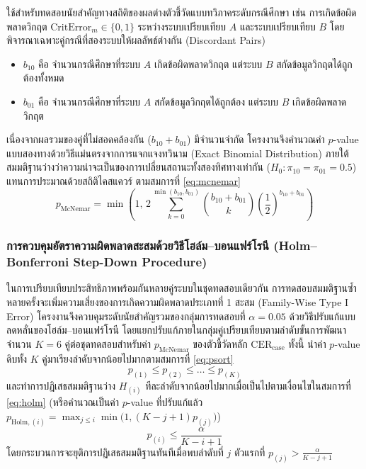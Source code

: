 ใช้สำหรับทดสอบนัยสำคัญทางสถิติของผลต่างตัวชี้วัดแบบทวิภาคระดับกรณีศึกษา เช่น การเกิดข้อผิดพลาดวิกฤต $\mathrm{CritError}_m \in \{0, 1\}$ ระหว่างระบบเปรียบเทียบ $A$ และระบบเปรียบเทียบ $B$ โดยพิจารณาเฉพาะคู่กรณีที่สองระบบให้ผลลัพธ์ต่างกัน (Discordant Pairs)
\begin{itemize}
    \item $b_{10}$ คือ จำนวนกรณีศึกษาที่ระบบ $A$ เกิดข้อผิดพลาดวิกฤต แต่ระบบ $B$ สกัดข้อมูลวิกฤตได้ถูกต้องทั้งหมด
    \item $b_{01}$ คือ จำนวนกรณีศึกษาที่ระบบ $A$ สกัดข้อมูลวิกฤตได้ถูกต้อง แต่ระบบ $B$ เกิดข้อผิดพลาดวิกฤต
\end{itemize}
เนื่องจากผลรวมของคู่ที่ไม่สอดคล้องกัน ($b_{10} + b_{01}$) มีจำนวนจำกัด โครงงานจึงคำนวณค่า $p$-value แบบสองทางด้วยวิธีแม่นตรงจากการแจกแจงทวินาม (Exact Binomial Distribution) ภายใต้สมมติฐานว่างว่าความน่าจะเป็นของการเปลี่ยนสถานะทั้งสองทิศทางเท่ากัน ($H_0: \pi_{10} = \pi_{01} = 0.5$) แทนการประมาณด้วยสถิติไคสแควร์ \cite{mcnemar1947note} ตามสมการที่ \eqref{eq:mcnemar}
\begin{equation}
p_{\mathrm{McNemar}} = \min\left(1,\, 2 \sum_{k=0}^{\min(b_{10}, b_{01})} \binom{b_{10} + b_{01}}{k} \left(\frac{1}{2}\right)^{b_{10} + b_{01}}\right)
\label{eq:mcnemar}
\end{equation}

\subsubsection{การควบคุมอัตราความผิดพลาดสะสมด้วยวิธีโฮล์ม--บอนแฟร์โรนี (Holm--Bonferroni Step-Down Procedure)}

ในการเปรียบเทียบประสิทธิภาพพร้อมกันหลายคู่ระบบในชุดทดสอบเดียวกัน การทดสอบสมมติฐานซ้ำหลายครั้งจะเพิ่มความเสี่ยงของการเกิดความผิดพลาดประเภทที่ 1 สะสม (Family-Wise Type I Error) โครงงานจึงควบคุมระดับนัยสำคัญรวมของกลุ่มการทดสอบที่ $\alpha = 0.05$ ด้วยวิธีปรับแก้แบบลดหลั่นของโฮล์ม--บอนแฟร์โรนี \cite{holm1979simple} โดยแยกปรับแก้ภายในกลุ่มคู่เปรียบเทียบตามลำดับขั้นการพัฒนาจำนวน $K = 6$ คู่ต่อชุดทดสอบสำหรับค่า $p_{\mathrm{McNemar}}$ ของตัวชี้วัดหลัก $\mathrm{CER}_{\mathrm{case}}$ ทั้งนี้ นำค่า $p$-value ดิบทั้ง $K$ คู่มาเรียงลำดับจากน้อยไปมากตามสมการที่ \eqref{eq:psort}
\begin{equation}
p_{(1)} \le p_{(2)} \le \dots \le p_{(K)}
\label{eq:psort}
\end{equation}
และทำการปฏิเสธสมมติฐานว่าง $H_{(i)}$ ทีละลำดับจากน้อยไปมากเมื่อเป็นไปตามเงื่อนไขในสมการที่ \eqref{eq:holm} (หรือคำนวณเป็นค่า $p$-value ที่ปรับแก้แล้ว $p_{\mathrm{Holm},(i)} = \max_{j \le i} \min\bigl(1, (K - j + 1)p_{(j)}\bigr)$)
\begin{equation}
p_{(i)} \le \frac{\alpha}{K - i + 1}
\label{eq:holm}
\end{equation}
โดยกระบวนการจะยุติการปฏิเสธสมมติฐานทันทีเมื่อพบลำดับที่ $j$ ตัวแรกที่ $p_{(j)} > \frac{\alpha}{K - j + 1}$


